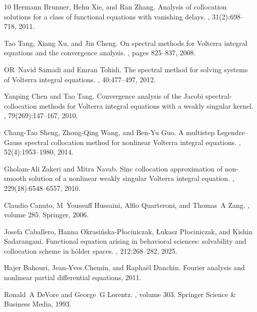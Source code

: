 \documentclass[12pt,a4paper]{article}
\begin{document}
\begin{thebibliography}{10}
	Hermann Brunner, Hehu Xie, and Ran Zhang.
	\newblock Analysis of collocation solutions for a class of functional equations
	with vanishing delays.
	, 31(2):698--718, 2011.
	
	Tao Tang, Xiang Xu, and Jin Cheng.
	\newblock On spectral methods for {V}olterra integral equations and the
	convergence analysis.
	, pages 825--837, 2008.
	
	OR~Navid Samadi and Emran Tohidi.
	\newblock The spectral method for solving systems of {V}olterra integral
	equations.
	, 40:477--497,
	2012.
	
	Yanping Chen and Tao Tang.
	\newblock Convergence analysis of the {J}acobi spectral-collocation methods for
	{V}olterra integral equations with a weakly singular kernel.
	, 79(269):147--167, 2010.
	
	Chang-Tao Sheng, Zhong-Qing Wang, and Ben-Yu Guo.
	\newblock A multistep {L}egendre--{G}auss spectral collocation method for
	nonlinear {V}olterra integral equations.
	, 52(4):1953--1980, 2014.
	
	Gholam-Ali Zakeri and Mitra Navab.
	\newblock Sinc collocation approximation of non-smooth solution of a nonlinear
	weakly singular {V}olterra integral equation.
	, 229(18):6548--6557, 2010.
	
	Claudio Canuto, M~Youssuff Hussaini, Alfio Quarteroni, and Thomas~A Zang.
	, volume 285.
	\newblock Springer, 2006.
	
	Josefa Caballero, Hanna Okrasi{\'n}ska-P{\l}ociniczak, {\L}ukasz
	P{\l}ociniczak, and Kishin Sadarangani.
	\newblock Functional equation arising in behavioral sciences: solvability and
	collocation scheme in h{\"o}lder spaces.
	, 212:268--282, 2025.
	
	Hajer Bahouri, Jean-Yves Chemin, and Rapha{\"e}l Danchin.
	\newblock Fourier analysis and nonlinear partial differential equations, 2011.
	
	Ronald~A DeVore and George~G Lorentz.
	, volume 303.
	\newblock Springer Science \& Business Media, 1993.
	

\end{thebibliography}
\end{document}
